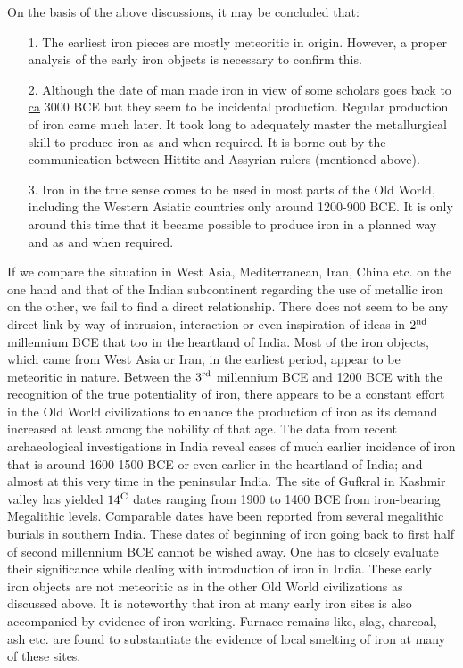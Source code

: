 {On the basis of the above discussions, it may be concluded that:
\begin{itemize}
\item[1.] The earliest iron pieces are mostly meteoritic in origin. However, a proper analysis of the early iron objects is necessary to confirm this.
\item[2.] Although the date of man made iron in view of some scholars goes back to \underline{ca} 3000 BCE but they seem to be incidental production. Regular production of iron came much later. It took long to adequately master the metallurgical skill to produce iron as and when required. It is borne out by the communication between Hittite and  Assyrian rulers (mentioned above).
\item[3.] Iron in the true sense comes to be used in most parts of the Old World, including the Western Asiatic countries only around 1200-900 BCE. It is only around this time that it became possible to produce iron in a planned way and as and when required.
\end{itemize}

If we compare the situation in West Asia, Mediterranean, Iran, China etc. on the one hand and that of the Indian subcontinent regarding the use of metallic iron on the other, we fail to find a direct relationship. There does not seem to be any direct link by way of intrusion, interaction or even inspiration of ideas in $2^{\rm nd}$ millennium BCE that too in the heartland of India. Most of the iron objects, which came from West Asia or Iran, in the earliest period, appear to be meteoritic in nature. Between the $3^{\rm rd}$ millennium BCE and 1200 BCE with the recognition of the true potentiality of iron, there appears to be a constant effort in the Old World civilizations to enhance the production of iron as its demand increased at least among the nobility of that age. The data from recent archaeological investigations in India reveal cases of much earlier incidence of iron that is around 1600-1500 BCE or even earlier in the heartland of India; and almost at this very time in the peninsular India. The site of Gufkral in Kashmir valley has yielded ${14}^{\rm C}$ dates ranging from 1900 to 1400 BCE from iron-bearing Megalithic levels. Comparable dates have been reported from several megalithic burials in southern India. These dates of beginning of iron going back to first half of second millennium BCE cannot be wished away. One has to closely evaluate their significance while dealing with introduction of iron in India. These early iron objects are not meteoritic as in the other Old World civilizations as discussed above. It is noteworthy that iron at many early iron sites is also accompanied by evidence of iron working. Furnace remains like, slag, charcoal, ash etc. are found to substantiate the evidence of local smelting of iron at many of these sites. 

}
